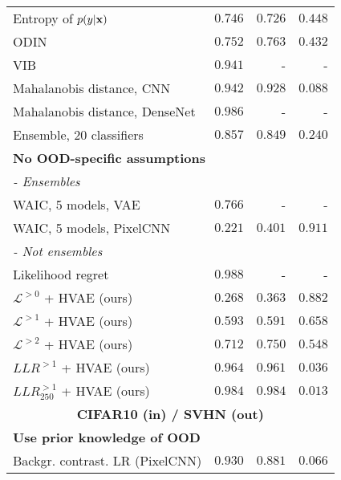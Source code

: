 {\begin{table}
{\begin{tabular}{lrrr}
Entropy of $p(y | {\mathbf{x}})$ {\parencite{ren_likelihood_2019}}                        & $0.746$ & $0.726$ & $0.448$ \\
ODIN {\parencite{ren_likelihood_2019, liang_enhancing_2018}}                                       & $0.752$ & $0.763$ & $0.432$ \\
VIB \parencite{alemi_uncertainty_2018, choi_waic_2019}                                          & $0.941$ & - & - \\
Mahalanobis distance, CNN {\parencite{ren_likelihood_2019}}                     & $0.942$ & $0.928$ & $0.088$ \\
Mahalanobis distance, DenseNet {\parencite{lee_simple_2018}}                & $0.986$ & - & - \\
Ensemble, 20 classifiers {\parencite{ren_likelihood_2019, lakshminarayanan_simple_2017}}                  & $0.857$ & $0.849$ & $0.240$ \\
         \multicolumn{4}{l}{\textbf{No OOD-specific assumptions}} \\
         \multicolumn{4}{l}{\textit{- Ensembles}} \\
WAIC, 5 models, VAE {\parencite{choi_waic_2019}}                          & $0.766$ & - & - \\
WAIC, 5 models, PixelCNN {\parencite{ren_likelihood_2019}}                      & $0.221$ & $0.401$ & $0.911$ \\
        \multicolumn{4}{l}{\textit{- Not ensembles}} \\
Likelihood regret \parencite{xiao_likelihood_2020}                               & $\mathbf{0.988}$ & - & - \\
$\mathcal{L}^{>0}$ + HVAE (ours)                    & $0.268$ & $0.363$ & $0.882$ \\
$\mathcal{L}^{>1}$ + HVAE (ours)                    & $0.593$ & $0.591$ & $0.658$ \\
$\mathcal{L}^{>2}$ + HVAE (ours)                    & $0.712$ & $0.750$ & $0.548$ \\
$LLR^{>1}$ + HVAE (ours)                            & $0.964$ & $0.961$ & $0.036$ \\
$LLR^{>1}_{250}$ + HVAE (ours)                      & $0.984$ & $\mathbf{0.984}$ & $\mathbf{0.013}$ \\
         \midrule
         \multicolumn{4}{c}{\textbf{CIFAR10 (in) / SVHN (out)}} \\
         \midrule
         \multicolumn{4}{l}{\textbf{Use prior knowledge of OOD}} \\
Backgr. contrast. LR (PixelCNN) {\parencite{ren_likelihood_2019}}               & $0.930$ & $0.881$ & $0.066$ \\

\end{tabular}}
\end{table}}
